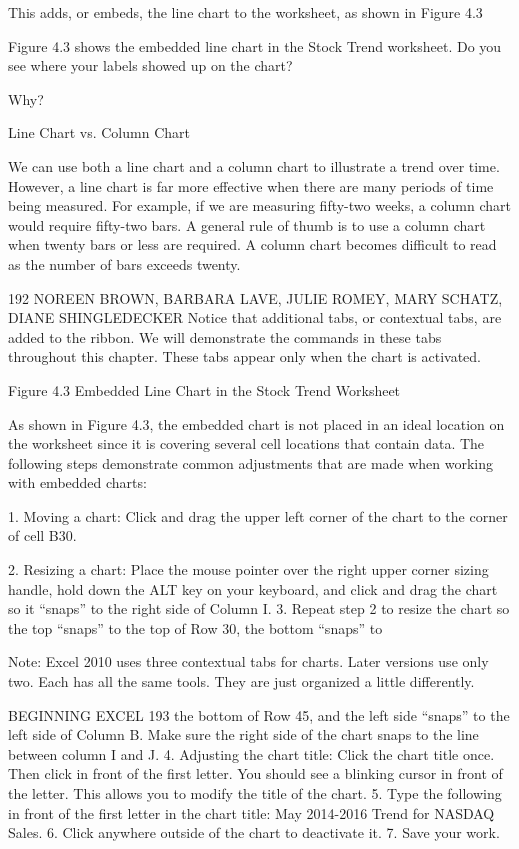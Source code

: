 This adds, or embeds, the line chart to the worksheet, as shown in Figure 4.3

Figure 4.3 shows the embedded line chart in the Stock Trend worksheet. Do you see where your labels
showed up on the chart?




Why?

Line Chart vs. Column Chart

We can use both a line chart and a column chart to illustrate a trend over time. However, a line chart is far more
effective when there are many periods of time being measured. For example, if we are measuring fifty-two weeks,
a column chart would require fifty-two bars. A general rule of thumb is to use a column chart when twenty bars or
less are required. A column chart becomes difficult to read as the number of bars exceeds twenty.




192 NOREEN BROWN, BARBARA LAVE, JULIE ROMEY, MARY SCHATZ, DIANE SHINGLEDECKER
Notice that additional tabs, or contextual tabs, are added to the ribbon. We will demonstrate the
commands in these tabs throughout this chapter. These tabs appear only when the chart is activated.




Figure 4.3 Embedded Line Chart in the Stock Trend Worksheet


As shown in Figure 4.3, the embedded chart is not placed in an ideal location on the worksheet
since it is covering several cell locations that contain data. The following steps demonstrate common
adjustments that are made when working with embedded charts:

1. Moving a chart: Click and drag the upper left corner of the chart to the corner of cell B30.


2. Resizing a chart: Place the mouse pointer over the right upper corner sizing handle, hold down
the ALT key on your keyboard, and click and drag the chart so it “snaps” to the right side of
Column I.
3. Repeat step 2 to resize the chart so the top “snaps” to the top of Row 30, the bottom “snaps” to




Note: Excel 2010 uses three contextual tabs for charts. Later versions use only two. Each has all the
same tools. They are just organized a little differently.




BEGINNING EXCEL 193
the bottom of Row 45, and the left side “snaps” to the left side of Column B. Make sure the right
side of the chart snaps to the line between column I and J.
4.   Adjusting the chart title: Click the chart title once. Then click in front of the first letter. You
should see a blinking cursor in front of the letter. This allows you to modify the title of the chart.
5.   Type the following in front of the first letter in the chart title: May 2014-2016 Trend for
NASDAQ Sales.
6.   Click anywhere outside of the chart to deactivate it.
7.   Save your work.

